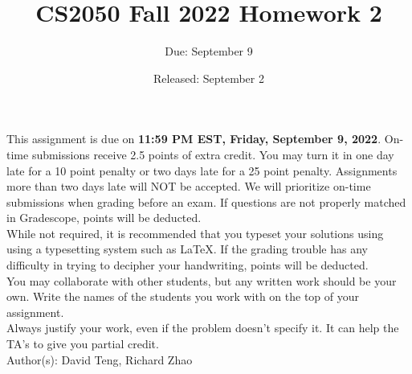 \documentclass{article}
\title{CS2050 Fall 2022 Homework 2}
\author{Due: September 9}
\date{Released: September 2}
\begin{document}
\maketitle

This assignment is due on \textbf{11:59 PM EST, Friday, September 9, 2022}.  On-time submissions receive 2.5 points of extra credit. You may turn it in one day late for a 10 point penalty or two days late for a 25 point penalty. Assignments more than two days late will NOT be accepted.  We will prioritize on-time submissions when grading before an exam. If questions are not properly matched in Gradescope, points will be deducted.\\

While not required, it is recommended that you typeset your solutions using using a typesetting system such as \LaTeX. If the grading trouble has any difficulty in trying to decipher your handwriting, points will be deducted. \\ 


You may collaborate with other students, but any written work should be your own. Write the names of the students you work with on the top of your assignment.\\

Always justify your work, even if the problem doesn't specify it. It can help the TA's to give you partial credit.
\\

Author(s): David Teng, Richard Zhao

\clearpage
\end{document}
